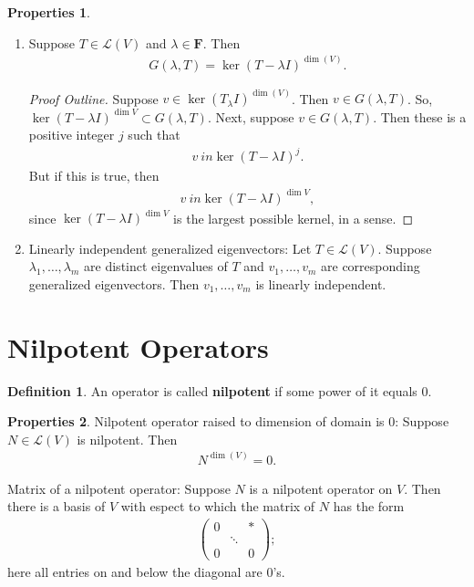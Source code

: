 \documentclass{book}
\theoremstyle{definition}
\newtheorem{defn}{Definition}[section]
\newtheorem{prop}{Properties}[section]
\newcommand{\lag}{\mathcal{L}}
\begin{document}
\begin{prop}
	\begin{enumerate}
		\item Suppose $T\in\lag(V)$ and $\lambda \in \mathbf{F}$. Then 
		\begin{align*}
		G(\lambda,T) = \ker(T-\lambda I)^{\dim(V)}.
		\end{align*}
		\begin{proof}[Proof Outline]
			Suppose $v\in \ker (T_\lambda I)^{\dim(V)}$. Then $v\in G(\lambda,T)$. So, $\ker(T-\lambda I)^{\dim V} \subset G(\lambda,T)$. Next, suppose $v\in G(\lambda,T)$. Then these is a positive integer $j$ such that
			\begin{align*}
			v\ in \ker (T-\lambda I)^j.
			\end{align*}
			But if this is true, then 
			\begin{align*}
			v\ in \ker (T-\lambda I)^{\dim V},
			\end{align*}
			since $\ker(T-\lambda I)^{\dim V}$ is the largest possible kernel, in a sense. 
		\end{proof}
		\item Linearly independent generalized eigenvectors: Let $T\in\lag(V)$. Suppose $\lambda_1,\dots,\lambda_m$ are distinct eigenvalues of $T$ and $v_1,\dots,v_m$ are corresponding generalized eigenvectors. Then $v_1,\dots,v_m$ is linearly independent.
	\end{enumerate}
\end{prop}

\section{Nilpotent Operators}
\begin{defn}
	An operator is called \textbf{nilpotent} if some power of it equals 0.
\end{defn}
\begin{prop}
	\item Nilpotent operator raised to dimension of domain is 0: Suppose $N\in \lag(V)$ is nilpotent. Then \begin{align*}
	N^{\dim(V)} = 0.
	\end{align*}
	\item Matrix of a nilpotent operator: Suppose $N$ is a nilpotent operator on $V$. Then there is a basis of $V$ with espect to which the matrix of $N$ has the form
	\begin{align*}
	\begin{pmatrix}
	0 & & *\\
	&\ddots&\\
	0&&0
	\end{pmatrix};
	\end{align*}
	here all entries on and below the diagonal are 0's. 
\end{prop}
\end{document}
